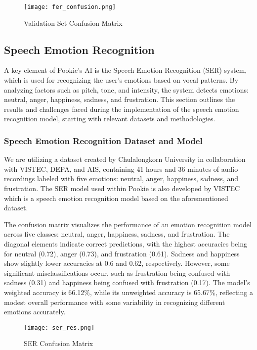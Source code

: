 \begin{figure}
    \centering
    \captionsetup{justification=centering}
    \texttt{[image: fer\_confusion.png]}
    \caption{Validation Set Confusion Matrix}
    \label{fig:fer-con}
\end{figure}

\newpage
\subsection{Speech Emotion Recognition}
A key element of Pookie’s AI is the Speech Emotion Recognition (SER) system, which is used for recognizing the user’s emotions based on vocal patterns. By analyzing factors such as pitch, tone, and intensity, the system detects emotions: neutral, anger, happiness, sadness, and frustration. This section outlines the results and challenges faced during the implementation of the  speech emotion recognition model, starting with relevant datasets and methodologies.

\subsubsection{Speech Emotion Recognition Dataset and Model}
We are utilizing a dataset created by Chulalongkorn University in collaboration with VISTEC, DEPA, and AIS, containing 41 hours and 36 minutes of audio recordings labeled with five emotions: neutral, anger, happiness, sadness, and frustration.
The SER model used within Pookie is also developed by VISTEC which is a speech emotion recognition model based on the aforementioned dataset. 

The confusion matrix visualizes the performance of an emotion recognition model across five classes: neutral, anger, happiness, sadness, and frustration. The diagonal elements indicate correct predictions, with the highest accuracies being for neutral (0.72), anger (0.73), and frustration (0.61). Sadness and happiness show slightly lower accuracies at 0.6 and 0.62, respectively. However, some significant misclassifications occur, such as frustration being confused with sadness (0.31) and happiness being confused with frustration (0.17). The model's weighted accuracy is 66.12\%, while its unweighted accuracy is 65.67\%, reflecting a modest overall performance with some variability in recognizing different emotions accurately.

\begin{figure} [!htb]
    \centering
    \captionsetup{justification=centering}
    \texttt{[image: ser\_res.png]}
    \caption{SER Confusion Matrix}
    \label{fig:ser-con}
\end{figure}

